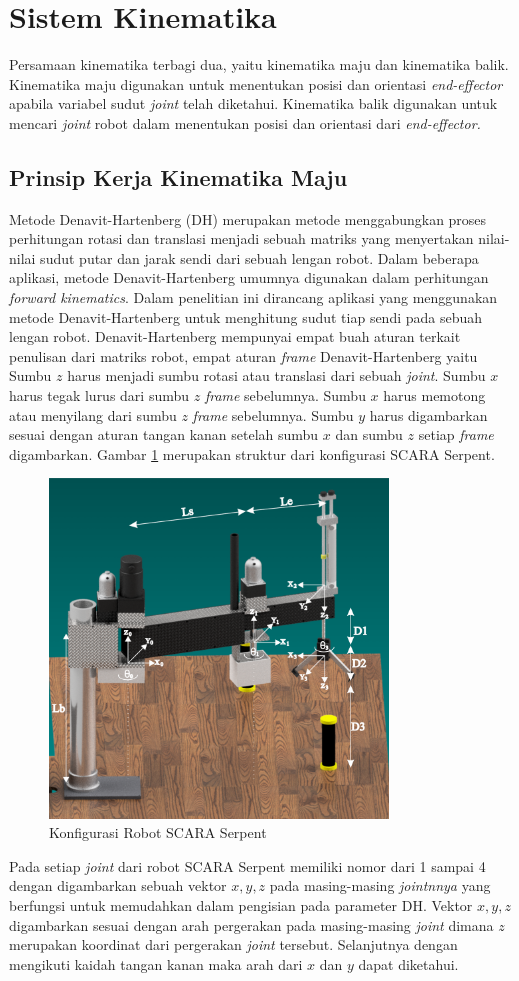 \section{Sistem Kinematika}
Persamaan kinematika terbagi dua, yaitu kinematika maju dan kinematika balik. Kinematika maju digunakan untuk menentukan posisi dan orientasi \textit{end-effector} apabila variabel sudut \textit{joint} telah diketahui. Kinematika balik digunakan untuk mencari \textit{joint} robot dalam menentukan posisi dan orientasi dari \textit{end-effector.}
\subsection{Prinsip Kerja Kinematika Maju}
	Metode Denavit-Hartenberg (DH) merupakan metode menggabungkan proses perhitungan rotasi dan translasi menjadi sebuah matriks yang menyertakan nilai-nilai sudut putar dan jarak sendi dari sebuah lengan robot. Dalam beberapa aplikasi, metode Denavit-Hartenberg umumnya digunakan dalam perhitungan \textit{forward kinematics}. Dalam penelitian ini dirancang aplikasi yang menggunakan metode Denavit-Hartenberg untuk menghitung sudut tiap sendi pada sebuah lengan robot. Denavit-Hartenberg mempunyai empat buah aturan terkait penulisan dari matriks robot, empat aturan \textit{frame} Denavit-Hartenberg yaitu Sumbu $z$ harus menjadi sumbu rotasi atau translasi dari sebuah \textit{joint}. Sumbu $x$ harus tegak lurus dari sumbu $z$ \textit{frame} sebelumnya. Sumbu $x$ harus memotong atau menyilang dari sumbu $z$ \textit{frame} sebelumnya. Sumbu $y$ harus digambarkan sesuai dengan aturan tangan kanan setelah sumbu $x$   dan sumbu $z$ setiap \textit{frame} digambarkan. Gambar \ref{dhSCARA} merupakan struktur dari konfigurasi SCARA Serpent.
\begin{figure}[H]
	\centering
	\includegraphics[width=9cm ]{gambar/SCARAdh.png}
	\caption{Konfigurasi Robot SCARA Serpent}
	\label{dhSCARA}
\end{figure}
Pada setiap \textit{joint} dari robot SCARA Serpent memiliki nomor dari 1 sampai 4 dengan digambarkan sebuah vektor $x, y, z$ pada masing-masing \textit{jointnnya} yang berfungsi untuk memudahkan dalam pengisian pada parameter DH. Vektor $x, y, z$ digambarkan sesuai dengan arah pergerakan pada masing-masing \textit{joint} dimana $z$ merupakan koordinat dari pergerakan \textit{joint} tersebut. Selanjutnya dengan mengikuti kaidah tangan kanan maka arah dari $x$ dan $y$ dapat diketahui. 

